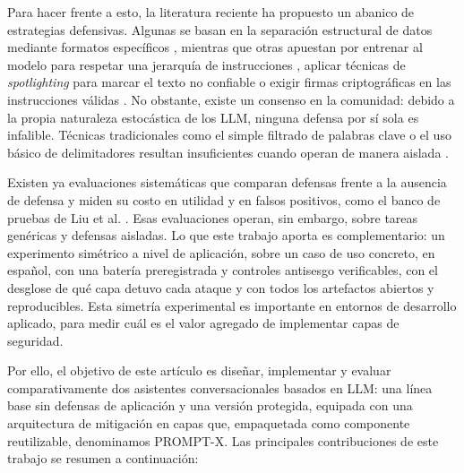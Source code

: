 \documentclass[twocolumn]{article}
\begin{document}
Para hacer frente a esto, la literatura reciente ha propuesto un abanico de estrategias defensivas. Algunas se basan en la separación estructural de datos mediante formatos específicos \cite{ref6}, mientras que otras apuestan por entrenar al modelo para respetar una jerarquía de instrucciones \cite{ref7}, aplicar técnicas de \textit{spotlighting} para marcar el texto no confiable \cite{ref8} o exigir firmas criptográficas en las instrucciones válidas \cite{ref9}. No obstante, existe un consenso en la comunidad: debido a la propia naturaleza estocástica de los LLM, ninguna defensa por sí sola es infalible. Técnicas tradicionales como el simple filtrado de palabras clave o el uso básico de delimitadores resultan insuficientes cuando operan de manera aislada \cite{ref9}.

Existen ya evaluaciones sistemáticas que comparan defensas frente a la ausencia de defensa y miden su costo en utilidad y en falsos positivos, como el banco de pruebas de Liu et al. \cite{ref5}. Esas evaluaciones operan, sin embargo, sobre tareas genéricas y defensas aisladas. Lo que este trabajo aporta es complementario: un experimento simétrico a nivel de aplicación, sobre un caso de uso concreto, en español, con una batería preregistrada y controles antisesgo verificables, con el desglose de qué capa detuvo cada ataque y con todos los artefactos abiertos y reproducibles. Esta simetría experimental es importante en entornos de desarrollo aplicado, para medir cuál es el valor agregado de implementar capas de seguridad.

Por ello, el objetivo de este artículo es diseñar, implementar y evaluar comparativamente dos asistentes conversacionales basados en LLM: una línea base sin defensas de aplicación y una versión protegida, equipada con una arquitectura de mitigación en capas que, empaquetada como componente reutilizable, denominamos PROMPT-X. Las principales contribuciones de este trabajo se resumen a continuación:
\end{document}
